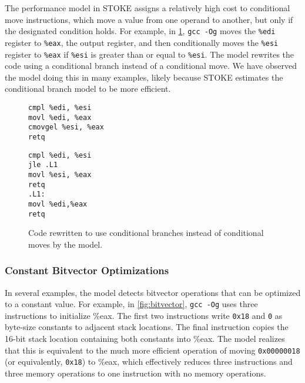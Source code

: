 \documentclass{article}
\begin{document}

The performance model in STOKE assigns a relatively high cost to conditional move instructions, which move a value from one operand to another, but only if the designated condition holds.  For example, in \cref{fig:conditional_move}, \texttt{gcc -Og} moves the \texttt{\%edi} register to \texttt{\%eax}, the output register, and then conditionally moves the \texttt{\%esi} register to \texttt{\%eax} if \texttt{\%esi} is greater than or equal to \texttt{\%esi}.
%
The model rewrites the code using a conditional branch instead of a conditional move.  We have observed the model doing this in many examples, likely because STOKE estimates the conditional branch model to be more efficient.

\begin{figure}
    \centering
    \begin{lstlisting}
cmpl %edi, %esi     
movl %edi, %eax    
cmovgel %esi, %eax 
retq 
    \end{lstlisting}
    \begin{lstlisting}
cmpl %edi, %esi     
jle .L1
movl %esi, %eax
retq
.L1:
movl %edi,%eax
retq
    \end{lstlisting}
    \caption{Code rewritten to use conditional branches instead of conditional moves by the model.}
    \label{fig:conditional_move}
\end{figure}

\subsubsection{Constant Bitvector Optimizations}

In several examples, the model detects bitvector operations that can be optimized to a constant value.  For example, in \cref{fig:bitvector}, \texttt{gcc -Og} uses three instructions to initialize \%eax. The first two instructions write \texttt{0x18} and \texttt{0} as byte-size constants to adjacent stack locations.  The final instruction copies the 16-bit stack location containing both constants into \%eax.  The model realizes that this is equivalent to the much more efficient operation of moving \texttt{0x00000018} (or equivalently, \texttt{0x18}) to \%eax, which effectively reduces three instructions and three memory operations to one instruction with no memory operations.
\end{document}
